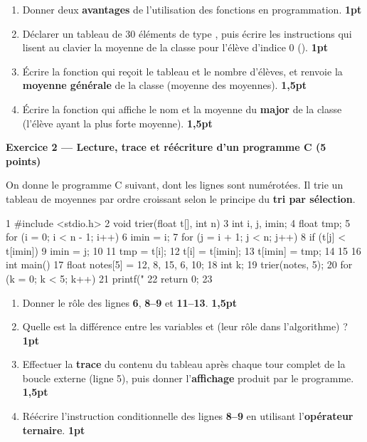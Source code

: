 \begin{enumerate}[label=\textbf{\arabic*-},leftmargin=2.2em]
\item Donner deux \textbf{avantages} de l'utilisation des fonctions en programmation. \hfill \textbf{1pt}
\item Déclarer un tableau  de 30 éléments de type ,
puis écrire les instructions qui lisent au clavier la moyenne de la classe pour
l'élève d'indice 0 (). \hfill \textbf{1pt}
\item Écrire la fonction  qui reçoit
le tableau et le nombre  d'élèves, et renvoie la \textbf{moyenne générale} de la
classe (moyenne des moyennes). \hfill \textbf{1,5pt}
\item Écrire la fonction  qui
affiche le nom et la moyenne du \textbf{major} de la classe (l'élève ayant la plus
forte moyenne). \hfill \textbf{1,5pt}
\end{enumerate}

\medskip
\textbf{Exercice 2 — Lecture, trace et réécriture d'un programme C \hfill (5 points)}

On donne le programme C suivant, dont les lignes sont numérotées. Il trie un tableau
de moyennes par ordre croissant selon le principe du \textbf{tri par sélection}.

\begin{codec}
1   #include <stdio.h>
2   void trier(float t[], int n) {
3     int i, j, imin;
4     float tmp;
5     for (i = 0; i < n - 1; i++) {
6       imin = i;
7       for (j = i + 1; j < n; j++) {
8         if (t[j] < t[imin])
9           imin = j;
10      }
11      tmp = t[i];
12      t[i] = t[imin];
13      t[imin] = tmp;
14    }
15  }
16  int main() {
17    float notes[5] = {12, 8, 15, 6, 10};
18    int k;
19    trier(notes, 5);
20    for (k = 0; k < 5; k++)
21      printf("%
22    return 0;
23  }
\end{codec}

\begin{enumerate}[label=\textbf{\arabic*-},leftmargin=2.2em]
\item Donner le rôle des lignes \textbf{6}, \textbf{8--9} et \textbf{11--13}. \hfill \textbf{1,5pt}
\item Quelle est la différence entre les variables  et  (leur
rôle dans l'algorithme) ? \hfill \textbf{1pt}
\item Effectuer la \textbf{trace} du contenu du tableau  après chaque
tour complet de la boucle externe (ligne 5), puis donner l'\textbf{affichage} produit
par le programme. \hfill \textbf{1,5pt}
\item Réécrire l'instruction conditionnelle des lignes \textbf{8--9} en utilisant
l'\textbf{opérateur ternaire}. \hfill \textbf{1pt}
\end{enumerate}

